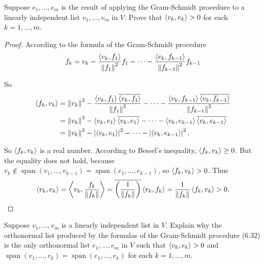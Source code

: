 \begin{exercise}\label{chapter6:sectionB:exercise9}
    Suppose $e_{1} , \ldots, e_{m}$ is the result of applying the Gram-Schmidt procedure to a linearly independent list $v_{1}, \ldots, v_{m}$ in $V$. Prove that $\left\langle{v_{k}, e_{k}}\right\rangle > 0$ for each $k = 1, \ldots, m$.
\end{exercise}

\begin{proof}
    According to the formula of the Gram-Schmidt procedure
    \[
        f_{k} = v_{k} - \frac{\left\langle{v_{k}, f_{1}}\right\rangle}{\left\Vert{f_{1}}\right\Vert^{2}}f_{1} - \cdots - \frac{\left\langle{v_{k}, f_{k-1}}\right\rangle}{\left\Vert{f_{k-1}}\right\Vert^{2}}f_{k-1}
    \]

    So
    \begin{align*}
        \left\langle{f_{k}, v_{k}}\right\rangle & = \left\Vert{v_{k}}\right\Vert^{2} - \frac{\left\langle{v_{k}, f_{1}}\right\rangle\overline{\left\langle{v_{k}, f_{1}}\right\rangle}}{\left\Vert{f_{1}}\right\Vert^{2}} - \cdots - \frac{\left\langle{v_{k}, f_{k-1}}\right\rangle\overline{\left\langle{v_{k}, f_{k-1}}\right\rangle}}{\left\Vert{f_{k-1}}\right\Vert^{2}} \\
                                 & = \left\Vert{v_{k}}\right\Vert^{2} - \left\langle{v_{k}, e_{1}}\right\rangle\overline{\left\langle{v_{k}, e_{1}}\right\rangle} - \cdots - \left\langle{v_{k}, e_{k-1}}\right\rangle\overline{\left\langle{v_{k}, e_{k-1}}\right\rangle}                                                     \\
                                 & = \left\Vert{v_{k}}\right\Vert^{2} - \left\vert{\left\langle{v_{k}, e_{1}}\right\rangle}\right\vert^{2} - \cdots - \left\vert{\left\langle{v_{k}, e_{k-1}}\right\rangle}\right\vert^{2}.
    \end{align*}

    So $\left\langle{f_{k}, v_{k}}\right\rangle$ is a real number. According to Bessel's inequality, $\left\langle{f_{k}, v_{k}}\right\rangle\geq 0$. But the equality does not hold, because $v_{k}\notin\operatorname{span}(v_{1}, \ldots, v_{k-1}) = \operatorname{span}(e_{1}, \ldots, e_{k-1})$, so $\left\langle{f_{k}, v_{k}}\right\rangle > 0$. Thus
    \[
        \left\langle{v_{k}, e_{k}}\right\rangle = \left\langle{v_{k}, \frac{f_{k}}{\left\Vert{f_{k}}\right\Vert}}\right\rangle = \overline{\left(\frac{1}{\left\Vert{f_{k}}\right\Vert}\right)}\left\langle{v_{k}, f_{k}}\right\rangle = \frac{1}{\left\Vert{f_{k}}\right\Vert}\left\langle{f_{k}, v_{k}}\right\rangle > 0.
    \]
\end{proof}
\newpage

\begin{exercise}
    Suppose $v_{1}, \ldots, v_{m}$ is a linearly independent list in $V$. Explain why the orthonormal list produced by the formulas of the Gram-Schmidt procedure (6.32) is the only orthonormal list $e_{1} , \ldots, e_{m}$ in $V$ such that $\left\langle{v_{k}, e_{k}}\right\rangle > 0$ and $\operatorname{span}(v_{1} , \ldots, v_{k}) = \operatorname{span}(e_{1} , \ldots, e_{k})$ for each $k = 1, \ldots, m$.
\end{exercise}

